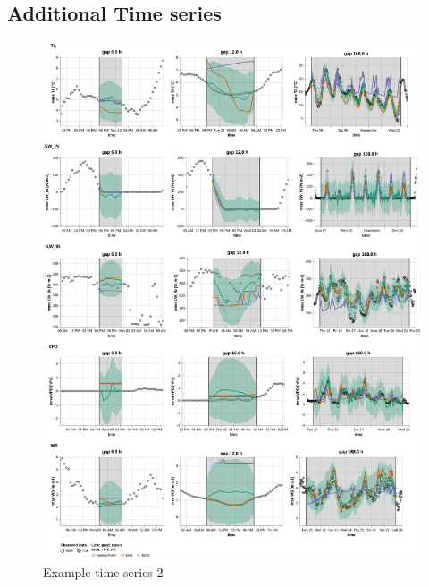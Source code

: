 \documentclass{article}
\newcommand{\imgwidth}{6in}
\let\Oldsubsection\subsection
\renewcommand{\subsection}{\FloatBarrier\Oldsubsection}
\begin{document}
\newcommand{\CapTheTableStand}{Imputation performance of the Kalman filter in comparison to the state-of-the-art
methods: ERA-Interim (ERA-I) and Marginal Distribution Sampling (MDS), using mean and standard deviation of the \textit{Root Mean Square Error} (RMSE). The best method for each gap length is highlighted in bold.}

\subsection{Additional Time series}

\begin{figure}
\centerline{\includegraphics[width=\imgwidth]{images2/timeseries_1_1}}
\caption{Example time series 2}
\label{fig:ts_2-1}
\end{figure}
\end{document}
